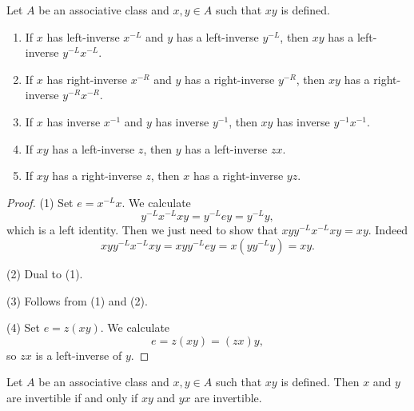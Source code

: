 \begin{lemma}
Let $A$ be an associative class and $x,y \in A$ such that $xy$ is defined.
\begin{enumerate}
\item If $x$ has left-inverse $x^{-L}$ and $y$ has a left-inverse $y^{-L}$, then $xy$ has a left-inverse $y^{-L}x^{-L}$.
\item If $x$ has right-inverse $x^{-R}$ and $y$ has a right-inverse $y^{-R}$, then $xy$ has a right-inverse $y^{-R}x^{-R}$.
\item If $x$ has inverse $x^{-1}$ and $y$ has inverse $y^{-1}$, then $xy$ has inverse $y^{-1}x^{-1}$.
\item If $xy$ has a left-inverse $z$, then $y$ has a left-inverse $zx$.
\item If $xy$ has a right-inverse $z$, then $x$ has a right-inverse $yz$.
\end{enumerate}
\end{lemma}
\begin{proof}
(1) Set $e = x^{-L}x$. We calculate
\[ y^{-L}x^{-L}xy = y^{-L}ey = y^{-L}y, \]
which is a left identity. Then we just need to show that $xyy^{-L}x^{-L}xy = xy$. Indeed
\[ xyy^{-L}x^{-L}xy = xyy^{-L}ey = x(yy^{-L}y) = xy. \]

(2) Dual to (1).

(3) Follows from (1) and (2).

(4) Set $e = z(xy)$. We calculate
\[ e = z(xy) = (zx)y, \]
so $zx$ is a left-inverse of $y$.
\end{proof}
\begin{corollary} \label{productInvertibility}
Let $A$ be an associative class and $x,y \in A$ such that $xy$ is defined. Then $x$ and $y$ are invertible \textup{if and only if} $xy$ and $yx$ are invertible.
\end{corollary}


